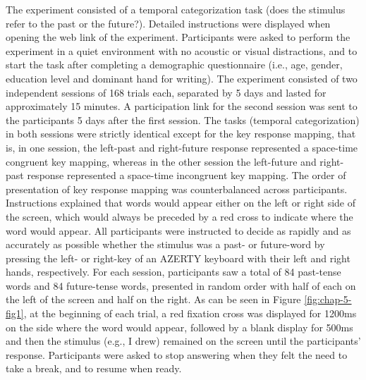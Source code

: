 \documentclass[
  a4paper,12pt,twoside,onecolumn,openright,final,oldfontcommands]{memoir}
\begin{document}
The experiment consisted of a temporal categorization task (does the stimulus refer to the past or the future?). Detailed instructions were displayed when opening the web link of the experiment. Participants were asked to perform the experiment in a quiet environment with no acoustic or visual distractions, and to start the task after completing a demographic questionnaire (i.e., age, gender, education level and dominant hand for writing). The experiment consisted of two independent sessions of 168 trials each, separated by 5 days and lasted for approximately 15 minutes. A participation link for the second session was sent to the participants 5 days after the first session. The tasks (temporal categorization) in both sessions were strictly identical except for the key response mapping, that is, in one session, the left-past and right-future response represented a space-time congruent key mapping, whereas in the other session the left-future and right-past response represented a space-time incongruent key mapping. The order of presentation of key response mapping was counterbalanced across participants. Instructions explained that words would appear either on the left or right side of the screen, which would always be preceded by a red cross to indicate where the word would appear. All participants were instructed to decide as rapidly and as accurately as possible whether the stimulus was a past- or future-word by pressing the left- or right-key of an AZERTY keyboard with their left and right hands, respectively. For each session, participants saw a total of 84 past-tense words and 84 future-tense words, presented in random order with half of each on the left of the screen and half on the right. As can be seen in Figure \ref{fig:chap-5-fig1}, at the beginning of each trial, a red fixation cross was displayed for 1200ms on the side where the word would appear, followed by a blank display for 500ms and then the stimulus (e.g., I drew) remained on the screen until the participants' response. Participants were asked to stop answering when they felt the need to take a break, and to resume when ready.
\end{document}
